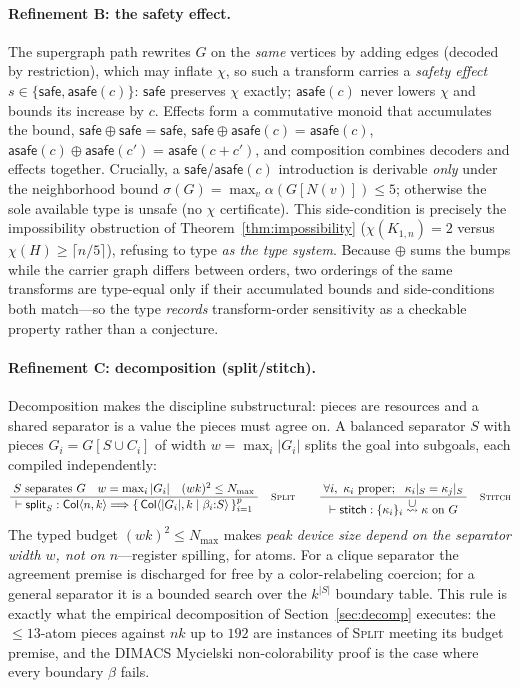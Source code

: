 \documentclass[11pt]{article}
\theoremstyle{definition}
\theoremstyle{remark}
\newcommand{\indep}{\alpha}
\newcommand{\tCol}{\mathsf{Col}}
\newcommand{\Nmax}{N_{\max}}
\newcommand{\safe}{\textsf{safe}}
\newcommand{\asafe}[1]{\textsf{asafe}(#1)}
\newcommand{\rn}[1]{\textsc{\footnotesize #1}}
\newcommand{\irule}[2]{\ensuremath{\dfrac{\;#1\;}{\;#2\;}}}
\newcommand{\redto}[1]{\mathrel{\overset{\textstyle #1}{\rightsquigarrow}}}
\begin{document}
\paragraph{Refinement B: the safety effect.}
\label{sec:safetyeff}
The supergraph path rewrites $G$ on the \emph{same} vertices by adding edges
(decoded by restriction), which may inflate $\chi$, so such a transform carries a
\emph{safety effect} $s\in\{\safe,\asafe{c}\}$:
$\safe$ preserves $\chi$ exactly; $\asafe{c}$ never lowers $\chi$ and bounds its
increase by $c$. Effects form a commutative monoid that accumulates the bound,
$\safe\oplus\safe=\safe$, $\safe\oplus\asafe{c}=\asafe{c}$,
$\asafe{c}\oplus\asafe{c'}=\asafe{c{+}c'}$, and composition combines decoders and
effects together. Crucially, a $\safe$/$\asafe{c}$ introduction is derivable
\emph{only} under the neighborhood bound
$\sigma(G)=\max_v\indep(G[N(v)])\le 5$; otherwise the sole available type is
\textsf{unsafe} (no $\chi$ certificate). This side-condition is precisely the
impossibility obstruction of Theorem~\ref{thm:impossibility}
($\chi(K_{1,n})=2$ versus $\chi(H)\ge\lceil n/5\rceil$), refusing to type
\emph{as the type system}. Because $\oplus$ sums the bumps while the carrier graph
differs between orders, two orderings of the same transforms are type-equal only if
their accumulated bounds and side-conditions both match---so the type \emph{records}
transform-order sensitivity as a checkable property rather than a conjecture.

\paragraph{Refinement C: decomposition (split/stitch).} Decomposition makes the
discipline substructural: pieces are resources and a shared separator is a value the
pieces must agree on. A balanced separator $S$ with pieces $G_i=G[S\cup C_i]$ of
width $w=\max_i|G_i|$ splits the goal into subgoals, each compiled independently:
\[
  \irule{S\ \text{separates}\ G \quad w=\max_i|G_i| \quad (wk)^2\le \Nmax}
        {\vdash \mathsf{split}_S : \tCol\langle n,k\rangle \Longrightarrow
           \{\,\tCol\langle |G_i|,k\mid\beta_i{:}S\rangle\,\}_{i=1}^{p}}
  \quad\rn{Split}
\qquad
  \irule{\forall i,\ \kappa_i\ \text{proper};\ \ \kappa_i|_S=\kappa_j|_S}
        {\vdash \mathsf{stitch} : \{\kappa_i\}_i \redto{\cup} \kappa\ \text{on}\ G}
  \quad\rn{Stitch}
\]
The typed budget $(wk)^2\le\Nmax$ makes \emph{peak device size depend on the
separator width $w$, not on $n$}---register spilling, for atoms. For a clique
separator the agreement premise is discharged for free by a color-relabeling
coercion; for a general separator it is a bounded search over the $k^{|S|}$ boundary
table. This rule is exactly what the empirical decomposition of
Section~\ref{sec:decomp} executes: the $\le 13$-atom pieces against $nk$ up to
$192$ are instances of \rn{Split} meeting its budget premise, and the DIMACS
Mycielski non-colorability proof is the case where every boundary $\beta$ fails.
\end{document}
